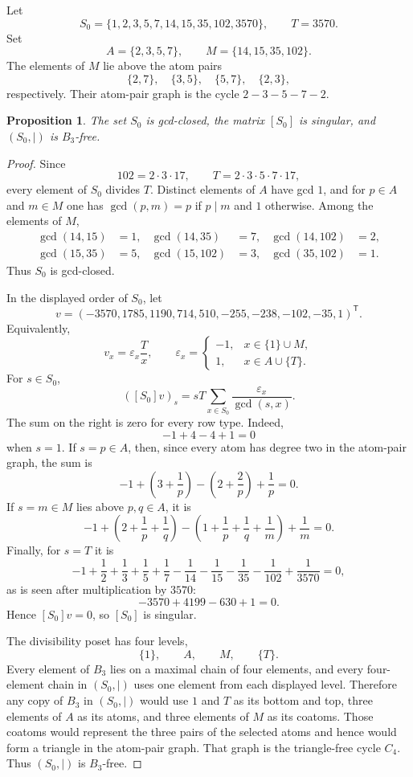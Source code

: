 \documentclass[11pt]{amsart}
\newtheorem{proposition}[theorem]{Proposition}
\begin{document}
Let
\[
 S_0=\{1,2,3,5,7,14,15,35,102,3570\},
 \qquad T=3570.
\]
Set
\[
 A=\{2,3,5,7\},\qquad M=\{14,15,35,102\}.
\]
The elements of $M$ lie above the atom pairs
\[
 \{2,7\},\quad \{3,5\},\quad \{5,7\},\quad \{2,3\},
\]
respectively. Their atom-pair graph is the cycle
$2-3-5-7-2$.

\begin{proposition}\label{prop:base}
The set $S_0$ is gcd-closed, the matrix $[S_0]$ is singular, and
$(S_0,\mid)$ is $B_3$-free.
\end{proposition}

\begin{proof}
Since
\[
 102=2\cdot3\cdot17,
 \qquad T=2\cdot3\cdot5\cdot7\cdot17,
\]
every element of $S_0$ divides $T$. Distinct elements of $A$ have
gcd $1$, and for $p\in A$ and $m\in M$ one has
$\gcd(p,m)=p$ if $p\mid m$ and $1$ otherwise. Among the elements of
$M$,
\[
\begin{aligned}
 \gcd(14,15)&=1, & \gcd(14,35)&=7, & \gcd(14,102)&=2,\\
 \gcd(15,35)&=5, & \gcd(15,102)&=3, & \gcd(35,102)&=1.
\end{aligned}
\]
Thus $S_0$ is gcd-closed.

In the displayed order of $S_0$, let
\[
 v=(-3570,1785,1190,714,510,-255,-238,-102,-35,1)^{\mathsf T}.
\]
Equivalently,
\[
 v_x=\varepsilon_x\frac{T}{x},
 \qquad
 \varepsilon_x=
 \begin{cases}
 -1,&x\in\{1\}\cup M,\\
  1,&x\in A\cup\{T\}.
 \end{cases}
\]
For $s\in S_0$,
\[
 ([S_0]v)_s
 =sT\sum_{x\in S_0}\frac{\varepsilon_x}{\gcd(s,x)}.
\]
The sum on the right is zero for every row type. Indeed,
\[
 -1+4-4+1=0
\]
when $s=1$. If $s=p\in A$, then, since every atom has degree two in
the atom-pair graph, the sum is
\[
 -1+\left(3+\frac1p\right)
 -\left(2+\frac2p\right)+\frac1p=0.
\]
If $s=m\in M$ lies above $p,q\in A$, it is
\[
 -1+\left(2+\frac1p+\frac1q\right)
 -\left(1+\frac1p+\frac1q+\frac1m\right)+\frac1m=0.
\]
Finally, for $s=T$ it is
\[
 -1+\frac12+\frac13+\frac15+\frac17
 -\frac1{14}-\frac1{15}-\frac1{35}-\frac1{102}
 +\frac1{3570}=0,
\]
as is seen after multiplication by $3570$:
\[
 -3570+4199-630+1=0.
\]
Hence $[S_0]v=0$, so $[S_0]$ is singular.

The divisibility poset has four levels,
\[
 \{1\},\qquad A,\qquad M,\qquad \{T\}.
\]
Every element of $B_3$ lies on a maximal chain of four elements,
and every four-element chain in $(S_0,\mid)$ uses one element from
each displayed level. Therefore any copy of $B_3$ in $(S_0,\mid)$
would use $1$ and $T$ as its bottom and top, three elements of $A$ as
its atoms, and three elements of $M$ as its coatoms. Those coatoms
would represent the three pairs of the selected atoms and hence
would form a triangle in the atom-pair graph. That graph is the
triangle-free cycle $C_4$. Thus $(S_0,\mid)$ is $B_3$-free.
\end{proof}
\end{document}
